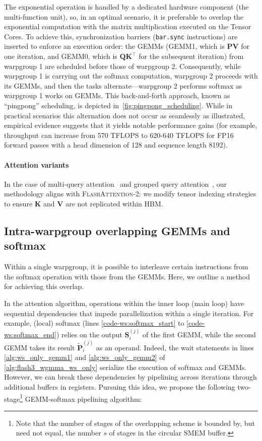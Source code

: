 The exponential operation is handled by a dedicated hardware component (the multi-function unit), so, in an optimal scenario, it is preferable to overlap the exponential computation with the matrix multiplication executed on the Tensor Cores. To achieve this, synchronization barriers (\texttt{bar.sync} instructions) are inserted to enforce an execution order: the GEMMs (GEMM1, which is $\mathbf{P} \mathbf{V}$ for one iteration, and GEMM0, which is $\mathbf{Q} \mathbf{K}^\top$ for the subsequent iteration) from warpgroup 1 are scheduled before those of warpgroup 2. Consequently, while warpgroup 1 is carrying out the softmax computation, warpgroup 2 proceeds with its GEMMs, and then the tasks alternate—warpgroup 2 performs softmax as warpgroup 1 works on GEMMs. This back-and-forth approach, known as ``pingpong'' scheduling, is depicted in~\cref{fig:pingpong_scheduling}. While in practical scenarios this alternation does not occur as seamlessly as illustrated, empirical evidence suggests that it yields notable performance gains (for example, throughput can increase from 570 TFLOPS to 620-640 TFLOPS for FP16 forward passes with a head dimension of 128 and sequence length 8192).

\paragraph{Attention variants} In the case of multi-query attention~\citep{shazeer2019fast} and grouped query attention~\citep{ainslie2023gqa}, our methodology aligns with \textsc{FlashAttention-2}: we modify tensor indexing strategies to ensure $\mathbf{K}$ and $\mathbf{V}$ are not replicated within HBM.

\subsection{Intra-warpgroup overlapping GEMMs and softmax}

Within a single warpgroup, it is possible to interleave certain instructions from the softmax operation with those from the GEMMs. Here, we outline a method for achieving this overlap.

In the attention algorithm, operations within the inner loop (main loop) have sequential dependencies that impede parallelization within a single iteration. For example, (local) softmax (lines \ref{code-ws:softmax_start} to \ref{code-ws:softmax_end}) relies on the output $\mathbf{S}_i^{(j)}$ of the first GEMM, while the second GEMM takes its result $\widetilde{\mathbf{P}}_i^{(j)}$ as an operand. Indeed, the wait statements in lines \ref{alg:ws_only_gemm1} and \ref{alg:ws_only_gemm2} of \cref{alg:flash3_wgmma_ws_only} serialize the execution of softmax and GEMMs. However, we can break these dependencies by pipelining across iterations through additional buffers in registers. Pursuing this idea, we propose the following two-stage\footnote{Note that the number of stages of the overlapping scheme is bounded by, but need not equal, the number $s$ of stages in the circular SMEM buffer.} GEMM-softmax pipelining algorithm:

